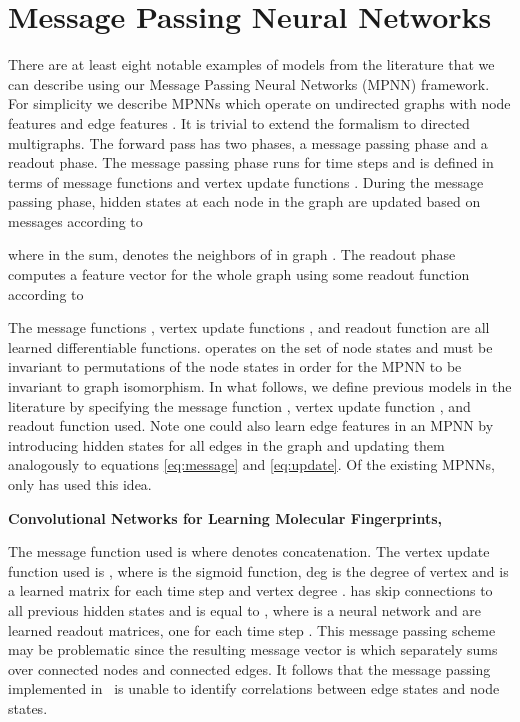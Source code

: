\documentclass{article}
\begin{document}
\section{Message Passing Neural Networks} \label{sec:mpnn}
There are at least eight notable examples of models from the literature that we can describe using our Message Passing Neural Networks (MPNN) framework. For simplicity we describe MPNNs which operate on undirected graphs  with node features  and edge features . It is trivial to extend the formalism to directed multigraphs. The forward pass has two phases, a message passing phase and a readout phase. The message passing phase runs for  time steps and is defined in terms of message functions  and vertex update functions . During the message passing phase, hidden states  at each node in the graph are updated based on messages  according to







 where in the sum,  denotes the neighbors of  in graph . The readout phase computes a feature vector for the whole graph using some readout function  according to

The message functions , vertex update functions , and readout function  are all learned differentiable functions.  operates on the set of node states and must be invariant to permutations of the node states in order for the MPNN to be invariant to graph isomorphism. In what follows, we define previous models in the literature by specifying the message function , vertex update function , and readout function  used. Note one could also learn edge features in an MPNN by introducing hidden states for all edges in the graph  and updating them analogously to equations \ref{eq:message} and \ref{eq:update}. Of the existing MPNNs, only \citet{kearnes2016molecular} has used this idea. 

\textbf{Convolutional Networks for Learning Molecular Fingerprints, \citet{duvenaud2015}}

The message function used is  where  denotes concatenation. The vertex update function used is , where  is the sigmoid function, deg is the degree of vertex  and  is a learned matrix for each time step  and vertex degree .  has skip connections to all previous hidden states  and is equal to , where  is a neural network and  are learned readout matrices, one for each time step . This message passing scheme may be problematic since the resulting message vector is 
which separately sums over connected nodes and connected edges. It follows that the message passing implemented in~\citet{duvenaud2015} is unable to identify correlations between edge states and node states.
\end{document}
